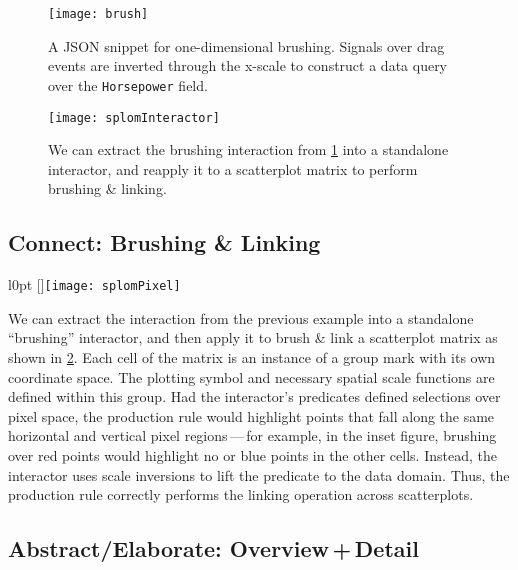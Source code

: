 \newpage

\begin{figure}[h!]
  \centering
  \texttt{[image: brush]}
  \caption{A JSON snippet for one-dimensional brushing. Signals over drag
  events are inverted through the x-scale to construct a data query over the
  \texttt{Horsepower} field.}
  \label{fig:vg:brush}
\end{figure}

\begin{figure}[h!]
  \centering
  \texttt{[image: splomInteractor]}
  \caption{We can extract the brushing interaction from \cref{fig:vg:brush}
  into a standalone interactor, and reapply it to a scatterplot matrix to
  perform brushing \& linking.}
  \label{fig:vg:splomInteractor}
\end{figure}

\newpage

\subsection{Connect: Brushing \& Linking}

\begin{wrapfigure}{l}{0pt}
  \raisebox{0pt}[\dimexpr{}\baselineskip\relax]{\texttt{[image: splomPixel]}}
\end{wrapfigure}

We can extract the interaction from the previous example into a standalone
``brushing'' interactor, and then apply it to brush \& link a scatterplot matrix
as shown in \cref{fig:vg:splomInteractor}. Each cell of the matrix is an
instance of a group mark with its own coordinate space. The plotting symbol and
necessary spatial scale functions are defined within this group. Had the
interactor's predicates defined selections over pixel space, the production rule
would highlight points that fall along the same horizontal and vertical pixel
regions\,---\,for example, in the inset figure, brushing over red points would
highlight no or blue points in the other cells. Instead, the interactor uses
scale inversions to lift the predicate to the data domain. Thus, the production
rule correctly performs the linking operation across scatterplots.

\subsection{Abstract/Elaborate: Overview\,+\,Detail}

